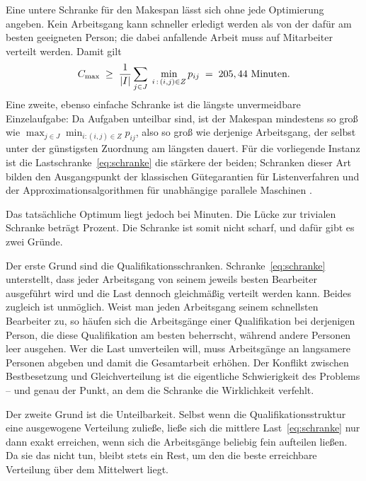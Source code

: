 Eine untere Schranke für den Makespan lässt sich ohne jede Optimierung angeben.
Kein Arbeitsgang kann schneller erledigt werden als von der dafür am besten
geeigneten Person; die dabei anfallende Arbeit muss auf \ZahlMitarbeiter{}
Mitarbeiter verteilt werden. Damit gilt
\begin{equation}
  C_{\max} \;\geq\; \frac{1}{|I|} \sum_{j \in J} \; \min_{i \,:\, (i,j) \in Z} p_{ij}
  \;=\; 205,44{}\ \text{Minuten}.
  \label{eq:schranke}
\end{equation}
Eine zweite, ebenso einfache Schranke ist die längste unvermeidbare
Einzelaufgabe: Da Aufgaben unteilbar sind, ist der Makespan mindestens so groß
wie
$\max_{j \in J} \min_{i : (i,j) \in Z} p_{ij}$, also so groß wie derjenige
Arbeitsgang, der selbst unter der günstigsten Zuordnung am längsten dauert. Für
die vorliegende Instanz ist die Lastschranke~\eqref{eq:schranke} die stärkere
der beiden; Schranken dieser Art bilden den Ausgangspunkt der klassischen
Gütegarantien für Listenverfahren \parencite{graham1969bounds} und der
Approximationsalgorithmen für unabhängige parallele Maschinen
\parencite{lenstra1990approximation}.

Das tatsächliche Optimum liegt jedoch bei \Optimum{} Minuten. Die Lücke zur
trivialen Schranke beträgt \LueckeSchranke{} Prozent. Die Schranke ist somit
nicht scharf, und dafür gibt es zwei Gründe.

Der erste Grund sind die Qualifikationsschranken. Schranke~\eqref{eq:schranke}
unterstellt, dass jeder Arbeitsgang von seinem jeweils besten Bearbeiter
ausgeführt wird und die Last dennoch gleichmäßig verteilt werden kann. Beides
zugleich ist unmöglich. Weist man jeden Arbeitsgang seinem schnellsten
Bearbeiter zu, so häufen sich die Arbeitsgänge einer Qualifikation bei
derjenigen Person, die diese Qualifikation am besten beherrscht, während andere
Personen leer ausgehen. Wer die Last umverteilen will, muss Arbeitsgänge an
langsamere Personen abgeben und damit die Gesamtarbeit erhöhen. Der Konflikt
zwischen Bestbesetzung und Gleichverteilung ist die eigentliche Schwierigkeit
des Problems -- und genau der Punkt, an dem die Schranke die Wirklichkeit
verfehlt.

Der zweite Grund ist die Unteilbarkeit. Selbst wenn die
Qualifikationsstruktur eine ausgewogene Verteilung zuließe, ließe sich die
mittlere Last~\eqref{eq:schranke} nur dann exakt erreichen, wenn sich die
Arbeitsgänge beliebig fein aufteilen ließen. Da sie das nicht tun, bleibt stets
ein Rest, um den die beste erreichbare Verteilung über dem Mittelwert liegt.

